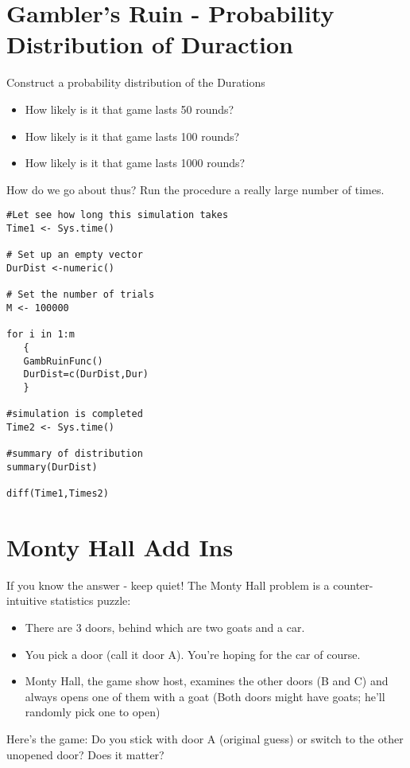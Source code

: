 \documentclass[]{article}
\begin{document}
\section{Gambler's Ruin - Probability Distribution of Duraction}
Construct a probability distribution of the Durations


\begin{itemize}
\item How likely is it that game lasts 50 rounds?
\item How likely is it that game lasts 100 rounds?
\item How likely is it that game lasts 1000 rounds?
\end{itemize}

How do we go about thus? Run the procedure a really large number of times.

\begin{framed}
\begin{verbatim}
#Let see how long this simulation takes
Time1 <- Sys.time()

# Set up an empty vector 
DurDist <-numeric()

# Set the number of trials
M <- 100000

for i in 1:m
   { 
   GambRuinFunc() 
   DurDist=c(DurDist,Dur)
   }

#simulation is completed   
Time2 <- Sys.time()

#summary of distribution
summary(DurDist)

diff(Time1,Times2)
\end{verbatim}
\end{framed}
\section{Monty Hall Add Ins}

If you know the answer - keep quiet!
The Monty Hall problem is a counter-intuitive statistics puzzle:

\begin{itemize}
\item There are 3 doors, behind which are two goats and a car.
\item You pick a door (call it door A). You’re hoping for the car of course.
\item Monty Hall, the game show host, examines the other doors (B and C) and always opens one of them with a goat (Both doors might have goats; he’ll randomly pick one to open) 
\end{itemize}
Here’s the game: Do you stick with door A (original guess) or switch to the other unopened door? Does it matter?
\newpage
\end{document}
